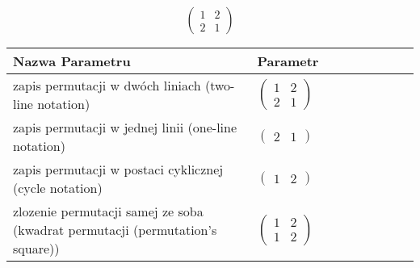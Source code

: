 \documentclass[12pt]{article}
\begin{document}
\subsection{}
\begin{center}
\[
\begin{pmatrix}
	1 & 2 \\ 
	2 & 1 
\end{pmatrix}
\]

\begin{tabular}{|m{0.6\linewidth}|m{0.4\linewidth}|}
	\hline
	Nazwa Parametru & Parametr \\
	\hline
	zapis permutacji w dwóch liniach (two-line notation) & $\begin{pmatrix} 1 & 2 \\ 
2 & 1 \end{pmatrix}$ \\ 
	\hline
	zapis permutacji w jednej linii (one-line notation) & $\begin{pmatrix} 2 & 1 \end{pmatrix}$ \\ 
	\hline
	zapis permutacji w postaci cyklicznej (cycle notation) & $\begin{pmatrix} 1 & 2 \end{pmatrix} $ \\ 
	\hline
	zlozenie permutacji samej ze soba (kwadrat permutacji (permutation's square)) & $\begin{pmatrix} 1 & 2 \\ 
1 & 2 \end{pmatrix}$ \\ 
	\hline
\end{tabular}
\end{center}
\end{document}
